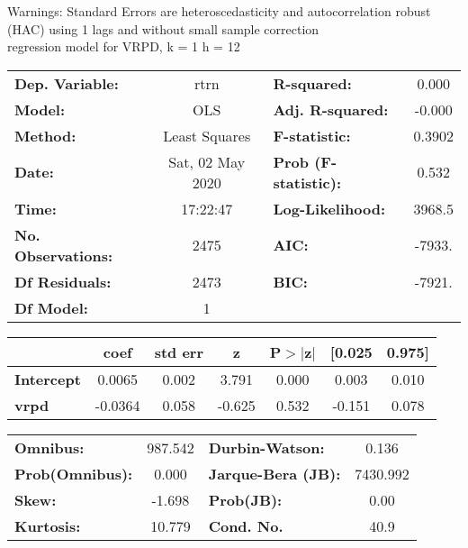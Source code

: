 Warnings: \newline
 [1] Standard Errors are heteroscedasticity and autocorrelation robust (HAC) using 1 lags and without small sample correction\\ 

regression model for VRPD, k = 1 h = 12\begin{center}
\begin{tabular}{lclc}
\toprule
\textbf{Dep. Variable:}    &       rtrn       & \textbf{  R-squared:         } &     0.000   \\
\textbf{Model:}            &       OLS        & \textbf{  Adj. R-squared:    } &    -0.000   \\
\textbf{Method:}           &  Least Squares   & \textbf{  F-statistic:       } &    0.3902   \\
\textbf{Date:}             & Sat, 02 May 2020 & \textbf{  Prob (F-statistic):} &    0.532    \\
\textbf{Time:}             &     17:22:47     & \textbf{  Log-Likelihood:    } &    3968.5   \\
\textbf{No. Observations:} &        2475      & \textbf{  AIC:               } &    -7933.   \\
\textbf{Df Residuals:}     &        2473      & \textbf{  BIC:               } &    -7921.   \\
\textbf{Df Model:}         &           1      & \textbf{                     } &             \\
\bottomrule
\end{tabular}
\begin{tabular}{lcccccc}
                   & \textbf{coef} & \textbf{std err} & \textbf{z} & \textbf{P$> |$z$|$} & \textbf{[0.025} & \textbf{0.975]}  \\
\midrule
\textbf{Intercept} &       0.0065  &        0.002     &     3.791  &         0.000        &        0.003    &        0.010     \\
\textbf{vrpd}      &      -0.0364  &        0.058     &    -0.625  &         0.532        &       -0.151    &        0.078     \\
\bottomrule
\end{tabular}
\begin{tabular}{lclc}
\textbf{Omnibus:}       & 987.542 & \textbf{  Durbin-Watson:     } &    0.136  \\
\textbf{Prob(Omnibus):} &   0.000 & \textbf{  Jarque-Bera (JB):  } & 7430.992  \\
\textbf{Skew:}          &  -1.698 & \textbf{  Prob(JB):          } &     0.00  \\
\textbf{Kurtosis:}      &  10.779 & \textbf{  Cond. No.          } &     40.9  \\
\bottomrule
\end{tabular}
\end{center}

